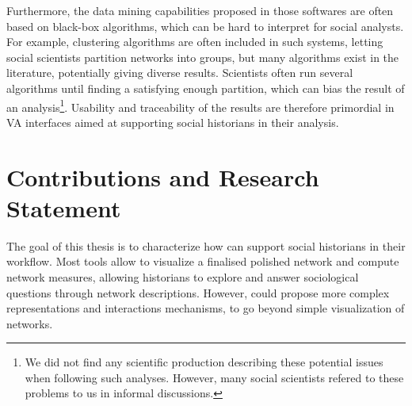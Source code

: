 Furthermore, the data mining capabilities proposed in those softwares are often based on black-box algorithms, which can be hard to interpret for social analysts.
For example, clustering algorithms are often included in such systems, letting social scientists partition networks into groups, but many algorithms exist in the literature, potentially giving diverse results.
Scientists often run several algorithms until finding a satisfying enough partition, which can bias the result of an analysis\footnote{We did not find any scientific production describing these potential issues when following such analyses. However, many social scientists refered to these problems to us in informal discussions.}.
Usability and traceability of the results are therefore primordial in VA interfaces aimed at supporting social historians in their analysis.




\section{Contributions and Research Statement}\label{sec:contribution-and-research-statement}

The goal of this thesis is to characterize how \va can support social historians in their \hsna workflow.
Most \snv tools allow to visualize a finalised polished network and compute network measures, allowing historians to explore and answer sociological questions through network descriptions.
However, \va could propose more complex representations and interactions mechanisms, to go beyond simple visualization of networks.

